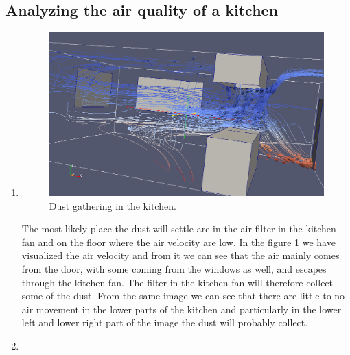 \documentclass[a4paper]{article}
\begin{document}
\subsection{Analyzing the air quality of a kitchen}

\begin{enumerate}
    \item

        \begin{figure}[H]
            \includegraphics[width=1\linewidth]{lab5/kitchen-dust-screenshot.png}
            \caption{Dust gathering in the kitchen.}
            \label{fig:dust}
        \end{figure}

        The most likely place the dust will settle are in the air filter in the
        kitchen fan and on the floor where the air velocity are low. In the
        figure \ref{fig:dust} we have visualized the air velocity and from it we
        can see that the air mainly comes from the door, with some coming from
        the windows as well, and escapes through the kitchen fan. The filter in
        the kitchen fan will therefore collect some of the dust. From the same
        image we can see that there are little to no air movement in the lower
        parts of the kitchen and particularly in the lower left and lower right
        part of the image the dust will probably collect.

    \item


\end{enumerate}
\end{document}

